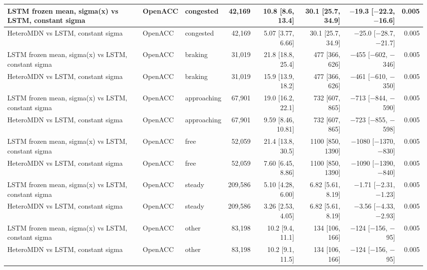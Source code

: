 \begin{longtable}{lllrrrrr}
\midrule
LSTM frozen mean, sigma(x) vs LSTM, constant sigma & OpenACC & congested & 42,169 & 10.8 [8.6, 13.4] & 30.1 [25.7, 34.9] & $-$19.3 [$-$22.2, $-$16.6] & 0.005 \\
\midrule
HeteroMDN vs LSTM, constant sigma & OpenACC & congested & 42,169 & 5.07 [3.77, 6.66] & 30.1 [25.7, 34.9] & $-$25.0 [$-$28.7, $-$21.7] & 0.005 \\
\midrule
LSTM frozen mean, sigma(x) vs LSTM, constant sigma & OpenACC & braking & 31,019 & 21.8 [18.8, 25.4] & 477 [366, 626] & $-$455 [$-$602, $-$346] & 0.005 \\
\midrule
HeteroMDN vs LSTM, constant sigma & OpenACC & braking & 31,019 & 15.9 [13.9, 18.2] & 477 [366, 626] & $-$461 [$-$610, $-$350] & 0.005 \\
\midrule
LSTM frozen mean, sigma(x) vs LSTM, constant sigma & OpenACC & approaching & 67,901 & 19.0 [16.2, 22.1] & 732 [607, 865] & $-$713 [$-$844, $-$590] & 0.005 \\
\midrule
HeteroMDN vs LSTM, constant sigma & OpenACC & approaching & 67,901 & 9.59 [8.46, 10.81] & 732 [607, 865] & $-$723 [$-$855, $-$598] & 0.005 \\
\midrule
LSTM frozen mean, sigma(x) vs LSTM, constant sigma & OpenACC & free & 52,059 & 21.4 [13.8, 30.5] & 1100 [850, 1390] & $-$1080 [$-$1370, $-$830] & 0.005 \\
\midrule
HeteroMDN vs LSTM, constant sigma & OpenACC & free & 52,059 & 7.60 [6.45, 8.86] & 1100 [850, 1390] & $-$1090 [$-$1390, $-$840] & 0.005 \\
\midrule
LSTM frozen mean, sigma(x) vs LSTM, constant sigma & OpenACC & steady & 209,586 & 5.10 [4.28, 6.00] & 6.82 [5.61, 8.19] & $-$1.71 [$-$2.31, $-$1.23] & 0.005 \\
\midrule
HeteroMDN vs LSTM, constant sigma & OpenACC & steady & 209,586 & 3.26 [2.53, 4.05] & 6.82 [5.61, 8.19] & $-$3.56 [$-$4.33, $-$2.93] & 0.005 \\
\midrule
LSTM frozen mean, sigma(x) vs LSTM, constant sigma & OpenACC & other & 83,198 & 10.2 [9.4, 11.1] & 134 [106, 166] & $-$124 [$-$156, $-$95] & 0.005 \\
\midrule
HeteroMDN vs LSTM, constant sigma & OpenACC & other & 83,198 & 10.2 [9.1, 11.5] & 134 [106, 166] & $-$124 [$-$156, $-$95] & 0.005 \\
\end{longtable}
\endgroup
